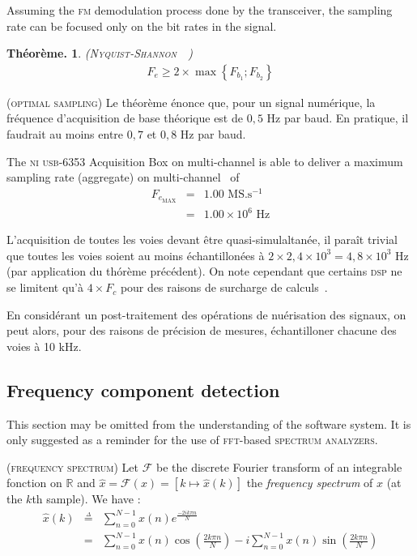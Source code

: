 \documentclass[twocolumn,pre,floats,aps,amsmath,amssymb]{revtex4}
\newtheorem{theorem}{Th\'eor\`eme.}[section]
\newenvironment{definition}[1][D\'efinition.]{\begin{trivlist}
\item[\hskip \labelsep {\bfseries #1}]}{\end{trivlist}}
\newenvironment{remark}[1][Remarque.]{\begin{trivlist}
\item[\hskip \labelsep {\bfseries #1}]}{\end{trivlist}}
\begin{document}
Assuming the \textsc{fm} demodulation process done by the transceiver, the sampling rate can be focused only on the bit rates in the signal.
\begin{theorem} (\textsc{Nyquist-Shannon}~\cite{Nyquist}~\cite{Shannon})
  \begin{eqnarray}
    F_e \geq 2 \times \operatorname{max} \left \{ F_{b_1} ; F_{b_2} \right \}
  \end{eqnarray}
\end{theorem}

\begin{remark}
  \textsc{(optimal sampling)}
  Le th\'eor\`eme \'enonce que, pour un signal num\'erique, la fr\'equence d'acquisition de base th\'eorique est de $0,5$ Hz par baud. En pratique, il faudrait au moins entre $0,7$ et $0,8$ Hz par baud\cite{FV}.
\end{remark}

The \textsc{ni usb-6353} Acquisition Box on multi-channel is able to deliver a maximum sampling rate (aggregate) on multi-channel~\cite{NI_6353_datasheet} of
\begin{eqnarray*}
  F_{e_{\text{MAX}}} &=& 1.00 \text{ MS.s$^{-1}$}\\
                &=& 1.00 \times 10^6 \text{ Hz}
\end{eqnarray*}

L'acquisition de toutes les voies devant \^etre quasi-simulaltan\'ee, il para\^it trivial que toutes les voies soient au moins \'echantillon\'ees \`a $2 \times 2,4 \times 10^3 = 4,8 \times 10^3$ Hz (par application du th\'or\`eme pr\'ec\'edent). On note cependant que certains \textsc{dsp} ne se limitent qu'\`a $4 \times F_c$ pour des raisons de surcharge de calculs~\cite{TI_MSP430}.

En consid\'erant un post-traitement des op\'erations de nu\'erisation des signaux, on peut alors, pour des raisons de pr\'ecision de mesures, \'echantilloner chacune des voies \`a 10 kHz.

\subsection{Frequency component detection}

{ \color{rltred}{\Radioactivity} } This section may be omitted from the understanding of the software system. It is only suggested as a reminder for the use of \textsc{fft}-based \textsc{spectrum analyzers}.

\begin{definition}
\textsc{(frequency spectrum)}
Let $\mathcal{F}$ be the discrete Fourier transform of an integrable fonction on $\mathbb{R}$ and $\hat{x} = \mathcal{F}(x) = \left [ k \mapsto \hat{x}(k)\right ]$ the \textit{frequency spectrum} of $x$ (at the $k$th sample). We have\cite{Senlis} :
\begin{eqnarray*}
\hat{x}(k) &\overset{\underset{\Delta}{}}{=}& \sum^{N - 1}_{n = 0}{x(n)e^{\frac{-2ik \pi n}{N}}}\\
           &=& \sum^{N - 1}_{n = 0}{x(n)\cos \left ( \frac{2k \pi n}{N} \right )} - i\sum^{N - 1}_{n = 0}{x(n)\sin \left ( \frac{2k \pi n}{N} \right )}
\end{eqnarray*}
\end{definition}
\end{document}
